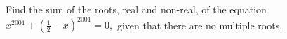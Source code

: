 Find the sum of the roots, real and non-real, of the equation $x^{2001}+\left(\frac 12-x\right)^{2001}=0,$ given that there are no multiple roots.